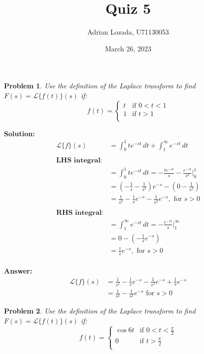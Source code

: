 \documentclass{article}
\title{Quiz 5}
\author{Adrian Lozada, U71130053}
\date{March 26, 2023}
\newtheorem{problem}{Problem}
\begin{document}
    \maketitle
    \newpage

    \begin{problem}
    Use the definition of the Laplace transform to find $F(s) = \mathcal{L}\{f(t)\}(s)$ if:
    \[
        f(t) = 
        \begin{cases}
            t & \text{if } 0 < t < 1 \\
            1 & \text{if } t > 1 \\
        \end{cases}
    \]
    \end{problem}
    
    \textbf{Solution:} \\
    \begin{align*}
        \mathcal{L}\{f\}(s) &= \int_0^1 te^{-st} \, dt + \int_1^\infty e^{-st} \, dt \\
        \\ %
        \textbf{LHS integral:} \\
        &= \int_0^1 te^{-st} \, dt = -\frac{te^{-st}}{s} - \frac{e^{-st}}{s^2} \Big|_0^1 \\
        &= \left(-\frac{1}{s} - \frac{1}{s^2}\right)e^{-s} - \left(0 - \frac{1}{s^2}\right) \\
        &= \frac{1}{s^2} - \frac{1}{s}e^{-s} - \frac{1}{s^2}e^{-s}, \text{ for } s > 0 \\
        \\ %
        \textbf{RHS integral:} \\
        &= \int_1^\infty e^{-st} \, dt = -\frac{e^{-st}}{s} \Big|_1^\infty \\
        &= 0 - \left(-\frac{1}{s}e^{-s}\right) \\
        &= \frac{1}{s}e^{-s}, \text{ for } s > 0
    \end{align*}
    \\ %
    \textbf{Answer:}
    \begin{align*}
       \mathcal{L}\{f\}(s) &= \frac{1}{s^2} - \frac{1}{s}e^{-s} - \frac{1}{s^2}e^{-s} + \frac{1}{s}e^{-s} \\
       &= \frac{1}{s^2} - \frac{1}{s^2}e^{-s} \text{ for } s > 0
    \end{align*} 

    \newpage
    \begin{problem}
        Use the definition of the Laplace transform to find $F(s) = \mathcal{L}\{f(t)\}(s)$ if:
        \[
            f(t) = 
            \begin{cases}
                \cos{6t} & \text{if } 0 < t < \frac{\pi}{2} \\
                0 & \text{if } t > \frac{\pi}{2} \\
            \end{cases}
        \]
    \end{problem}
    
\end{document}
